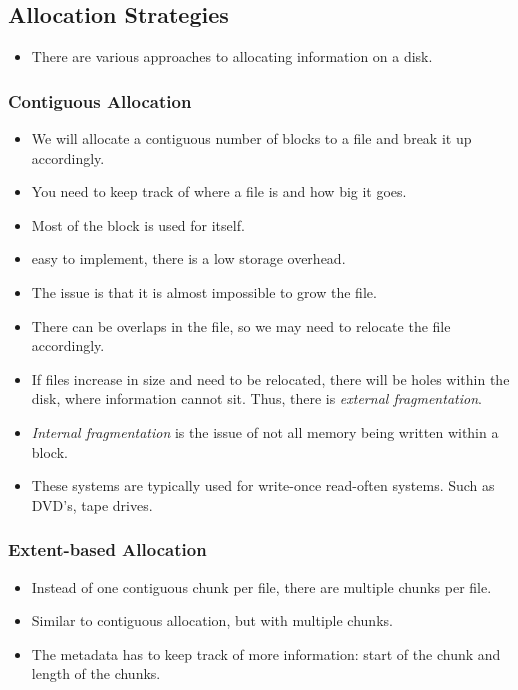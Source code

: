 \documentclass[]{article}
\begin{document}
\subsection{Allocation Strategies}
\begin{itemize}
\item There are various approaches to allocating information on a disk.
\end{itemize}

\subsubsection{Contiguous Allocation}
\begin{itemize}
\item We will allocate a contiguous number of blocks to a file and break it up
accordingly.
\item You need to keep track of where a file is and how big it goes.
\item Most of the block is used for itself.
\item easy to implement, there is a low storage overhead.
\item The issue is that it is almost impossible to grow the file.
\item There can be overlaps in the file, so we may need to relocate the file
accordingly.
\item If files increase in size and need to be relocated, there will be holes
within the disk, where information cannot sit. Thus, there is \emph{external
fragmentation}.
\item \emph{Internal fragmentation} is the issue of not all memory being written
within a block.
\item These systems are typically used for write-once read-often systems. Such
as DVD's, tape drives.
\end{itemize}

\subsubsection{Extent-based Allocation}
\begin{itemize}
\item Instead of one contiguous chunk per file, there are multiple chunks per
file.
\item Similar to contiguous allocation, but with multiple chunks.
\item The metadata has to keep track of more information: start of the chunk and
length of the chunks.
\end{itemize}
\end{document}
